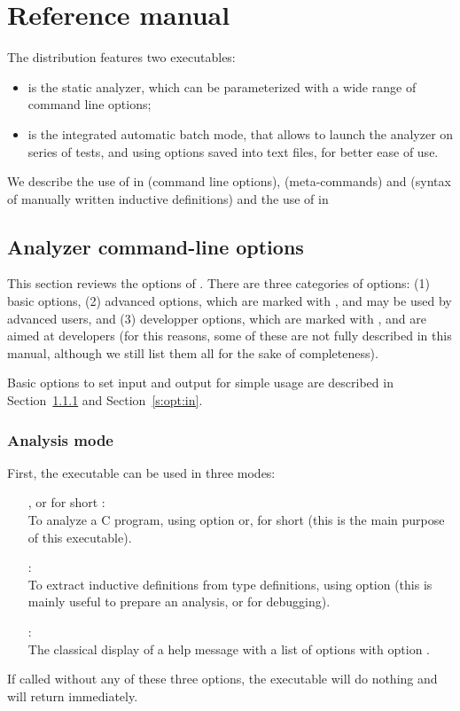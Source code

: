 \chapter{Reference manual}
\label{c:3:refman}

The \memcad distribution features two executables:
\begin{itemize}
\item \sanalyze is the static analyzer, which can be parameterized
  with a wide range of command line options;
\item {} is the integrated automatic batch mode, that allows
  to launch the analyzer on series of tests, and using options saved into
  text files, for better ease of use.
\end{itemize}
We describe the use of \sanalyze in  (command line
options),  (\memcad meta-commands) and 
(syntax of manually written inductive definitions) and the use of
 in 

\section{Analyzer command-line options}
\label{s:3:1:analyze}
This section reviews the options of \sanalyze.
There are three categories of options:
(1) basic options,
(2) advanced options, which are marked with \optadv, and may be
used by advanced users, and
(3) developper options, which are marked with \optdev, and are aimed
at \memcad developers (for this reasons, some of these are not fully
described in this manual, although we still list them all for the
sake of completeness).

Basic options to set input and output for simple usage are described
in Section~\ref{s:opt:mode} and Section~\ref{s:opt:in}.

\subsection{Analysis mode}
\label{s:opt:mode}
First, the \sanalyze executable can be used in three modes:
\begin{itemize}
\item[\doption{-analyze}, or for short \doption{-a}]: \\
  To analyze a C program, using option  or, for
  short  (this is the main purpose of this executable).
\item[\doption{-infer-ind}]: \\
  To extract inductive definitions from type definitions, using
  option  (this is mainly useful to prepare an
  analysis, or for debugging).
\item[\doption{-help}]: \\
  The classical display of a help message with a list of options
  with option .
\end{itemize}
If called without any of these three options, the \sanalyze
executable will do nothing and will return immediately.

